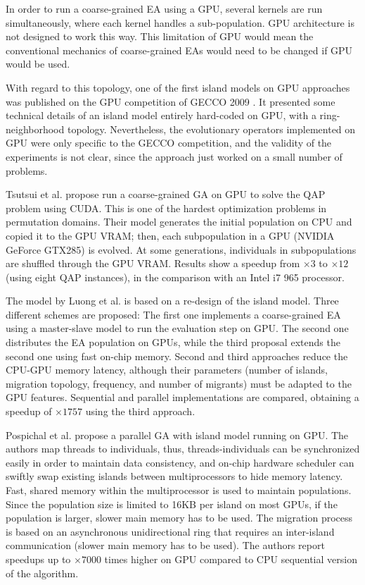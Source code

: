 \documentclass{comjnl}
\begin{document}
In order to run a coarse-grained EA using a GPU, several kernels are run simultaneously, where each kernel handles a sub-population. GPU architecture is not designed to work this way. This limitation of GPU would mean the conventional mechanics of coarse-grained EAs would need to be changed if GPU would be used.

With regard to this topology, one of the first island models on GPU approaches was published on the GPU competition of GECCO 2009 \cite{gecco2009CompetitionPospichal}. It presented some technical details of an island model entirely hard-coded on GPU, with a ring-neighborhood topology. Nevertheless, the evolutionary operators implemented on GPU were only specific to the GECCO competition, and the validity of the experiments is not clear, since the approach just worked on a small number of problems.

Tsutsui et al. \cite{1570355} propose run a coarse-grained GA on GPU to solve the QAP problem using CUDA. This is one of the hardest optimization problems in permutation domains. 
Their model generates the initial population on CPU and copied it to the GPU VRAM; then, each subpopulation in a GPU (NVIDIA GeForce GTX285) is evolved. At some generations, individuals in subpopulations are shuffled through the GPU VRAM. Results show a speedup from $\times3$ to $\times12$ (using eight QAP instances), in the comparison with an Intel i7 965 processor. 

The model by Luong et al. \cite{LUONG:2010:INRIA-00520464:1} is based on a re-design of the island model.
Three different schemes are proposed: The first one implements a coarse-grained EA using a master-slave model to run the evaluation step on GPU. The second one distributes the EA population on GPUs, while the third proposal extends the second one using fast on-chip memory. 
Second and third approaches reduce the CPU-GPU memory latency, although their parameters (number of islands, migration topology, frequency, and number of migrants) must be adapted to the GPU features. 
Sequential and parallel implementations are compared, obtaining a speedup of $\times1757$ using the third approach.

Pospichal et al. \cite{pospichalParallelGeneticAlgorithOnCUDA2010,9253} propose a parallel GA with island model running on GPU. The authors map threads to individuals, thus, threads-individuals can be synchronized easily in order to maintain data consistency, and on-chip hardware scheduler can swiftly swap existing islands between multiprocessors to hide memory latency. Fast, shared memory within the multiprocessor is used to maintain populations.
Since the population size is limited to 16KB per island on most GPUs, if the population is larger, slower main memory has to be used. The migration process is based on an asynchronous unidirectional ring that requires an inter-island communication (slower main memory has to be used). The authors report speedups up to $\times7000$ times higher on GPU compared to CPU sequential version of the algorithm.
\end{document}
